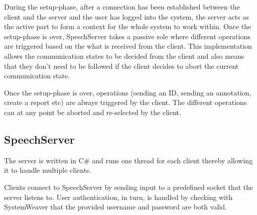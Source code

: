 \documentclass[conference]{IEEEtran}
\begin{document}
During the setup-phase, after a connection has been established between the client and the server and the user has logged into the system, the server acts as the active part to form a context for the whole system to work within. 
Once the setup-phase is over, SpeechServer takes a passive role where different operations are triggered based on the what is received from the client. %
This implementation allows the communication states to be decided from the client and also means that they don't need to be followed if the client decides to abort the current communication state.

Once the setup-phase is over, operations (sending an ID, sending an annotation, create a report etc) are always triggered by the client. The different operations can at any point be aborted and re-selected by the client.


\subsection{SpeechServer}
The server is written in C\# and runs one thread for each client thereby allowing it to handle multiple clients. 

Clients connect to SpeechServer by sending input to a predefined socket that the server listens to.
User authentication, in turn, is handled by checking with SystemWeaver that the provided username and password are both valid.
\end{document}
